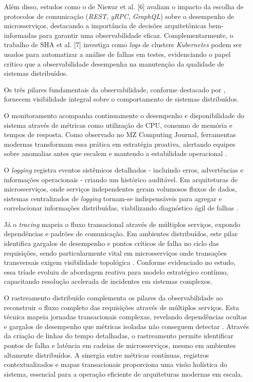 Além disso, estudos como o de Niswar et al. [6] avaliam o impacto da escolha de protocolos de comunicação (\textit{REST}, \textit{gRPC}, \textit{GraphQL}) sobre o desempenho de microsserviços, destacando a importância de decisões arquitetônicas bem-informadas para garantir uma observabilidade eficaz. Complementarmente, o trabalho de SHA et al. [7] investiga como \textit{logs} de clusters \textit{Kubernetes} podem ser usados para automatizar a análise de falhas em testes, evidenciando o papel crítico que a observabilidade desempenha na manutenção da qualidade de sistemas distribuídos.

Os três pilares fundamentais da observabilidade, conforme destacado por \cite{sandeep2022observability}, fornecem visibilidade integral sobre o comportamento de sistemas distribuídos.

O monitoramento acompanha continuamente o desempenho e disponibilidade do sistema através de métricas como utilização de CPU, consumo de memória e tempos de resposta. Como observado no MZ Computing Journal, ferramentas modernas transformam essa prática em estratégia proativa, alertando equipes sobre anomalias antes que escalem e mantendo a estabilidade operacional \cite{sandeep2022observability}.

O \textit{logging} registra eventos sistêmicos detalhados - incluindo erros, advertências e informações operacionais - criando um histórico auditável. Em arquiteturas de microsserviços, onde serviços independentes geram volumosos fluxos de dados, sistemas centralizados de \textit{logging} tornam-se indispensáveis para agregar e correlacionar informações distribuídas, viabilizando diagnóstico ágil de falhas \cite{sandeep2022observability}.

Já o \textit{tracing} mapeia o fluxo transacional através de múltiplos serviços, expondo dependências e padrões de comunicação. Em ambientes distribuídos, este pilar identifica gargalos de desempenho e pontos críticos de falha no ciclo das requisições, sendo particularmente vital em microsserviços onde transações transversais exigem visibilidade topológica \cite{sandeep2022observability}. Conforme evidenciado no estudo, essa tríade evoluiu de abordagem reativa para modelo estratégico contínuo, capacitando resolução acelerada de incidentes em sistemas complexos.

O rastreamento distribuído complementa os pilares da observabilidade ao reconstruir o fluxo completo das requisições através de múltiplos serviços. Esta técnica mapeia jornadas transacionais complexas, revelando dependências ocultas e gargalos de desempenho que métricas isoladas não conseguem detectar \cite{sandeep2022observability}. Através da criação de linhas do tempo detalhadas, o rastreamento permite identificar pontos de falha e latência em cadeias de microsserviços, mesmo em ambientes altamente distribuídos. A sinergia entre métricas contínuas, registros contextualizados e mapas transacionais proporciona uma visão holística do sistema, essencial para a operação eficiente de arquiteturas modernas em escala.

